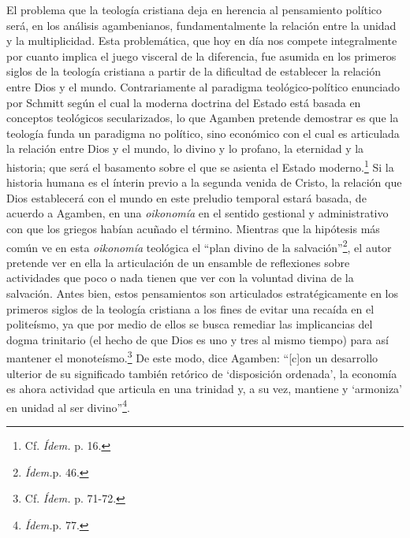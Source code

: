 El problema que la teología cristiana deja en herencia al pensamiento político será, en los análisis agambenianos, fundamentalmente la relación entre la unidad y la multiplicidad. Esta problemática, que hoy en día nos compete integralmente por cuanto implica el juego visceral de la diferencia, fue asumida en los primeros siglos de la teología cristiana a partir de la dificultad de establecer la relación entre Dios y el mundo. Contrariamente al paradigma teológico-político enunciado por Schmitt según el cual la moderna doctrina del Estado está basada en conceptos teológicos secularizados, lo que Agamben pretende demostrar es que la teología funda un paradigma no político, sino económico con el cual es articulada la relación entre Dios y el mundo, lo divino y lo profano, la eternidad y la historia; que será el basamento sobre el que se asienta el Estado moderno.\footnote{Cf. \emph{Ídem.} p. 16.} Si la historia humana es el ínterin previo a la segunda venida de Cristo, la relación que Dios establecerá con el mundo en este preludio temporal estará basada, de acuerdo a Agamben, en una \emph{oikonomía} en el sentido gestional y administrativo con que los griegos habían acuñado el término. Mientras que la hipótesis más común ve en esta \emph{oikonomía} teológica el \enquote{plan divino de la salvación}\footnote{\emph{Ídem.}p. 46.}, el autor pretende ver en ella la articulación de un ensamble de reflexiones sobre actividades que poco o nada tienen que ver con la voluntad divina de la salvación. Antes bien, estos pensamientos son articulados estratégicamente en los primeros siglos de la teología cristiana a los fines de evitar una recaída en el politeísmo, ya que por medio de ellos se busca remediar las implicancias del dogma trinitario (el hecho de que Dios es uno y tres al mismo tiempo) para así mantener el monoteísmo.\footnote{Cf. \emph{Ídem.} p. 71-72.} De este modo, dice Agamben: \enquote{{[}c{]}on un desarrollo ulterior de su significado también retórico de \enquote{disposición ordenada}, la economía es ahora actividad  que articula en una trinidad y, a su vez, mantiene y \enquote{armoniza} en unidad al ser divino}\footnote{\emph{Ídem.}p. 77.}.


